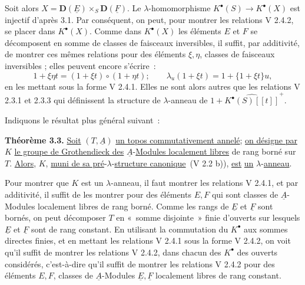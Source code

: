 
Soit alors \(X=\mathbf D(\underline{E})\times_S \mathbf D(\underline{F})\). Le \(\lambda\)-homomorphisme \(K^{\bullet}(S)\to K^{\bullet}(X)\) est injectif d'après 3.1. Par conséquent, on peut, pour montrer les relations V 2.4.2, se placer dans \(K^{\bullet}(X)\). Comme dans \(K^{\bullet}(X)\) les éléments \(E\) et \(F\) se décomposent en somme de classes de faisceaux inversibles, il suffit, par additivité, de montrer ces mêmes relations pour des éléments \(\xi,\eta\), classes de faisceaux inversibles ; elles peuvent encore s'écrire~:
\[
  1+\xi\eta t=(1+\xi t)\circ(1+\eta t);
  \qquad
  \lambda_u(1+\xi t)=1+\{1+\xi t\}u,
\]
en les mettant sous la forme V 2.4.1. Elles ne sont alors autres que les relations V 2.3.1 et 2.3.3 qui définissent la structure de \(\lambda\)-anneau de \(1+\widehat{K^{\bullet}(S)[[t]]}^{+}\).

Indiquons le résultat plus général suivant~:

\textbf{Théorème 3.3.} \uline{Soit} \((T,\underline{A})\) \uline{un topos commutativement annelé}; \uline{on désigne par} \(K\) \uline{le groupe de Grothendieck des} \(\underline{A}\)-\uline{Modules localement libres} de rang borné sur \(T\). \uline{Alors}, \(K\), \uline{muni de sa pré}-\(\lambda\)-\uline{structure canonique}~(V 2.2 b)), \uline{est} \uline{un} \(\lambda\)-\uline{anneau}.

Pour montrer que \(K\) est un \(\lambda\)-anneau, il faut montrer les relations V 2.4.1, et par additivité, il suffit de les montrer pour des éléments \(E,F\) qui sont classes de \(\underline{A}\)-Modules localement libres de rang borné. Comme les rangs de \(\underline{E}\) et \(\underline{F}\) sont bornés, on peut décomposer \(T\) en «~somme disjointe~» finie d'ouverts sur lesquels \(\underline{E}\) et \(\underline{F}\) sont de rang constant. En utilisant la commutation du \(K^{\bullet}\) aux sommes directes finies, et en mettant les relations V 2.4.1 sous la forme V 2.4.2, on voit qu'il suffit de montrer les relations V 2.4.2, dans chacun des \(K^{\bullet}\) des ouverts considérés, c'est-à-dire qu'il suffit de montrer les relations V 2.4.2 pour des éléments \(E,F\), classes de \(\underline{A}\)-Modules \(\underline{E},\underline{F}\) localement libres de rang constant.

